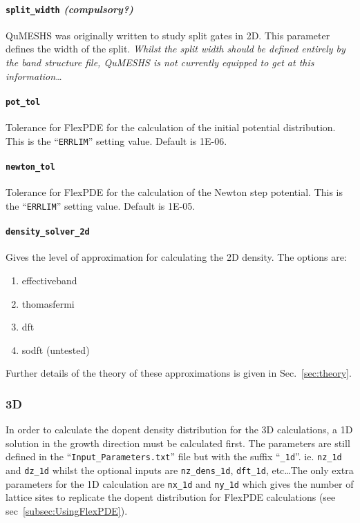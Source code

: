 \documentclass[12pt]{article}
\newcommand{\red}[1]{{\color{red} \it #1}}
\begin{document}
\paragraph{\texttt{split\_width} \emph{(compulsory?)}}
QuMESHS was originally written to study split gates in 2D.  This parameter defines the
width of the split.  \red{Whilst the split width should be defined entirely by the band
structure file, QuMESHS is not currently equipped to get at this information\ldots}

\paragraph{\texttt{pot\_tol}}
Tolerance for FlexPDE for the calculation of the initial potential distribution.
This is the ``\texttt{ERRLIM}'' setting value.  Default is 1E-06.

\paragraph{\texttt{newton\_tol}}
Tolerance for FlexPDE for the calculation of the Newton step potential.
This is the ``\texttt{ERRLIM}'' setting value.  Default is 1E-05.

\paragraph{\texttt{density\_solver\_2d}}
Gives the level of approximation for calculating the 2D density.  The options are:
\begin{enumerate}
    \item effectiveband
    \item thomasfermi
    \item dft
    \item sodft (untested)
\end{enumerate}
Further details of the theory of these approximations is given in Sec.~\ref{sec:theory}.


\subsubsection{3D}

In order to calculate the dopent density distribution for the 3D calculations, a 1D
solution in the growth direction must be calculated first.  The parameters are still
defined in the ``\texttt{Input\_Parameters.txt}'' file but with the suffix ``\texttt{\_1d}''.
ie. \texttt{nz\_1d} and \texttt{dz\_1d} whilst the optional inputs are \texttt{nz\_dens\_1d},
\texttt{dft\_1d}, etc\ldots  The only extra parameters for the 1D calculation are
\texttt{nx\_1d} and \texttt{ny\_1d} which gives the number of lattice sites to replicate
the dopent distribution for FlexPDE calculations (see sec~\ref{subsec:UsingFlexPDE}).
\end{document}
